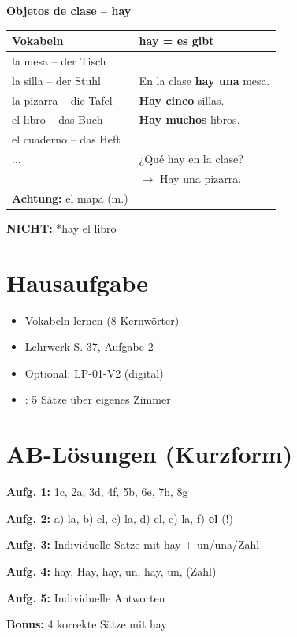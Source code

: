 \documentclass[11pt,a4paper]{article}
\begin{document}
\begin{tcolorbox}[colback=white, colframe=grau]
\textbf{Objetos de clase -- hay}

\vspace{0.3cm}
\begin{tabular}{p{6cm}|p{6cm}}
\textbf{Vokabeln} & \textbf{hay = es gibt} \\
\hline
la mesa -- der Tisch & \\
la silla -- der Stuhl & En la clase \textbf{hay una} mesa. \\
la pizarra -- die Tafel & \textbf{Hay cinco} sillas. \\
el libro -- das Buch & \textbf{Hay muchos} libros. \\
el cuaderno -- das Heft & \\
... & ¿Qué hay en la clase? \\
& $\rightarrow$ Hay una pizarra. \\
\textbf{Achtung:} el mapa (m.) & \\
\end{tabular}

\vspace{0.3cm}
\textbf{NICHT:} *hay el libro
\end{tcolorbox}

\vspace{0.5cm}

\section*{Hausaufgabe}

\begin{itemize}[nosep]
    \item Vokabeln lernen (8 Kernwörter)
    \item Lehrwerk S. 37, Aufgabe 2
    \item Optional: LP-01-V2 (digital)
    \item [E]: 5 Sätze über eigenes Zimmer
\end{itemize}

\vspace{0.5cm}

\section*{AB-Lösungen (Kurzform)}

\textbf{Aufg. 1:} 1c, 2a, 3d, 4f, 5b, 6e, 7h, 8g

\textbf{Aufg. 2:} a) la, b) el, c) la, d) el, e) la, f) \textbf{el} (!)

\textbf{Aufg. 3:} Individuelle Sätze mit hay + un/una/Zahl

\textbf{Aufg. 4:} hay, Hay, hay, un, hay, un, (Zahl)

\textbf{Aufg. 5:} Individuelle Antworten

\textbf{Bonus:} 4 korrekte Sätze mit hay
\end{document}
